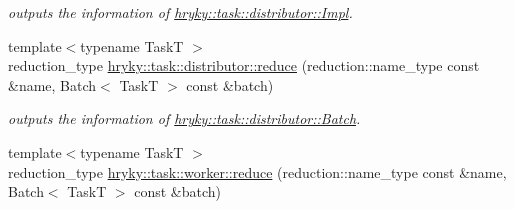 \begin{DoxyCompactItemize}
\begin{DoxyCompactList}\small\item\em outputs the information of \hyperlink{classhryky_1_1task_1_1distributor_1_1_impl}{hryky\-::task\-::distributor\-::\-Impl}. \end{DoxyCompactList}\item 
\hypertarget{group__task_ga89a7a92c43485c438438ab4b97184a27}{{\footnotesize template$<$typename Task\-T $>$ }\\reduction\-\_\-type \hyperlink{group__task_ga89a7a92c43485c438438ab4b97184a27}{hryky\-::task\-::distributor\-::reduce} (reduction\-::name\-\_\-type const \&name, Batch$<$ Task\-T $>$ const \&batch)}\label{group__task_ga89a7a92c43485c438438ab4b97184a27}

\begin{DoxyCompactList}\small\item\em outputs the information of \hyperlink{classhryky_1_1task_1_1distributor_1_1_batch}{hryky\-::task\-::distributor\-::\-Batch}. \end{DoxyCompactList}\item 
\hypertarget{group__task_ga7bfbcc99f638cedafbdc6174770c4da1}{{\footnotesize template$<$typename Task\-T $>$ }\\reduction\-\_\-type \hyperlink{group__task_ga7bfbcc99f638cedafbdc6174770c4da1}{hryky\-::task\-::worker\-::reduce} (reduction\-::name\-\_\-type const \&name, Batch$<$ Task\-T $>$ const \&batch)}\label{group__task_ga7bfbcc99f638cedafbdc6174770c4da1}


\end{DoxyCompactItemize}
